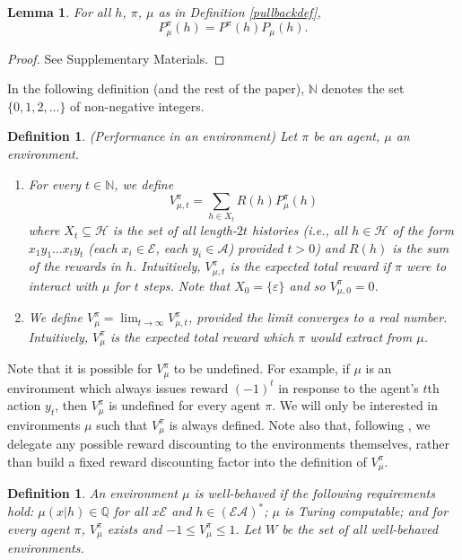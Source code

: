 \documentclass[twoside]{article}
\newtheorem{definition}[theorem]{Definition}
\newtheorem{lemma}[theorem]{Lemma}
\begin{document}
\begin{lemma}
\label{factorizationlemma}
    For all $h$, $\pi$, $\mu$ as in Definition \ref{pullbackdef},
    \[
        P^\pi_\mu(h) = P^\pi(h)P_\mu(h).
    \]
\end{lemma}

\begin{proof}
    See Supplementary Materials.
\end{proof}

In the following definition (and the rest of the paper),
$\mathbb N$ denotes the set $\{0,1,2,\ldots\}$ of non-negative
integers.

\begin{definition}
\label{performancedefn}
    (Performance in an environment)
    Let $\pi$ be an agent, $\mu$ an environment.
    \begin{enumerate}
    \item
        For every $t\in\mathbb N$,
        we define
        \[
            V^\pi_{\mu,t}=\sum_{h\in X_t}R(h)P^\pi_\mu(h)
        \]
        where $X_t\subseteq\mathcal H$ is the set of all
        length-$2t$ histories (i.e., all $h\in\mathcal H$ of the form
        $x_1y_1\ldots x_ty_t$ (each $x_i\in\mathcal E$, each $y_i\in\mathcal A$)
        provided $t>0$) and $R(h)$ is the sum of the rewards in $h$.
        Intuitively, $V^\pi_{\mu,t}$ is the expected total reward
        if $\pi$ were to interact with $\mu$ for $t$ steps.
        Note that $X_0=\{\varepsilon\}$ and so $V^\pi_{\mu,0}=0$.
    \item
        We define $V^\pi_\mu=\lim_{t\to\infty}V^\pi_{\mu,t}$,
        provided the limit converges to a real number.
        Intuitively, $V^\pi_\mu$ is the expected total reward which $\pi$ would extract
        from $\mu$.
    \end{enumerate}
\end{definition}

Note that it is possible for $V^\pi_\mu$ to be undefined.
For example, if $\mu$ is an environment which always issues
reward $(-1)^t$ in response to the agent's $t$th action $y_t$,
then $V^\pi_\mu$ is undefined for every agent $\pi$.
We will only be interested in
environments $\mu$ such that $V^\pi_\mu$
is always defined. Note also that, following \cite{legg2007universal},
we delegate any possible reward discounting to the environments themselves,
rather than build a fixed reward discounting factor into the definition
of $V^\pi_\mu$.

\begin{definition}
\label{wellbehaveddefn}
    An environment $\mu$ is \emph{well-behaved} if the following
    requirements hold: $\mu(x|h)\in\mathbb Q$
    for all $x\mathcal E$ and $h\in (\mathcal E\mathcal A)^*$; $\mu$ is Turing
    computable; and for every agent $\pi$, $V^\pi_\mu$ exists and
    $-1\leq V^\pi_\mu\leq 1$. Let $W$ be the set of all well-behaved environments.
\end{definition}
\end{document}
